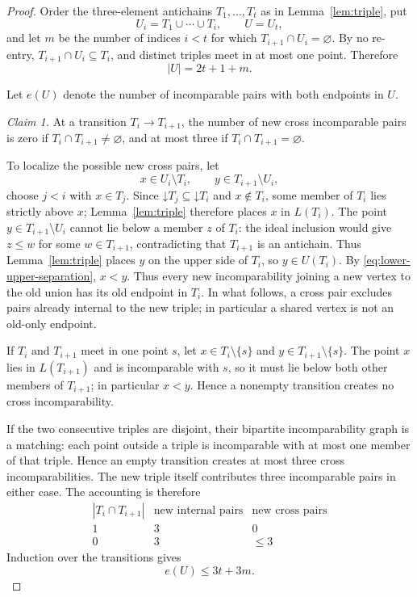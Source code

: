 \documentclass[11pt]{article}
\numberwithin{equation}{section}
\theoremstyle{definition}
\theoremstyle{remark}
\newcommand{\down}{\mathord{\downarrow}}
\begin{document}
\begin{proof}
Order the three-element antichains
$T_1,\ldots,T_t$ as in Lemma~\ref{lem:triple}, put
\[
        U_i=T_1\cup\cdots\cup T_i,\qquad U=U_t,
\]
and let $m$ be the number of indices $i<t$ for which
$T_{i+1}\cap U_i=\varnothing$.  By no re-entry,
$T_{i+1}\cap U_i\subseteq T_i$, and distinct triples meet in at most one
point.  Therefore
\begin{equation}\label{eq:triple-union-card}
|U|=2t+1+m.
\end{equation}

Let $e(U)$ denote the number of incomparable pairs with both endpoints in
$U$.

\emph{Claim 1.}  At a transition $T_i\to T_{i+1}$, the number of new cross
incomparable pairs is zero if $T_i\cap T_{i+1}\ne\varnothing$, and at most
three if $T_i\cap T_{i+1}=\varnothing$.

To localize the possible new cross pairs, let
\[
 x\in U_i\setminus T_i,\qquad
 y\in T_{i+1}\setminus U_i,
\]
choose $j<i$ with $x\in T_j$.  Since $\down T_j\subseteq\down T_i$
and $x\notin T_i$, some member of $T_i$ lies strictly above $x$;
Lemma~\ref{lem:triple} therefore places $x$ in $L(T_i)$.
The point $y\in T_{i+1}\setminus U_i$ cannot lie below a member
$z$ of $T_i$: the ideal inclusion would give $z\le w$ for some
$w\in T_{i+1}$, contradicting that $T_{i+1}$ is an antichain.
Thus Lemma~\ref{lem:triple} places $y$ on the upper side of $T_i$,
so $y\in U(T_i)$.  By \eqref{eq:lower-upper-separation}, $x<y$.
Thus every new incomparability joining a new vertex to the old union
has its old endpoint in $T_i$.  In what follows, a cross pair excludes
pairs already internal to the new triple; in particular a shared vertex
is not an old-only endpoint.

If $T_i$ and $T_{i+1}$ meet in one point $s$, let
$x\in T_i\setminus\{s\}$ and
$y\in T_{i+1}\setminus\{s\}$.  The point $x$ lies in $L(T_{i+1})$ and is
incomparable with $s$, so it must lie below both other members of
$T_{i+1}$; in particular $x<y$.  Hence a nonempty transition creates no
cross incomparability.

If the two consecutive triples are disjoint, their bipartite
incomparability graph is a matching: each point outside a triple is
incomparable with at most one member of that triple.  Hence an empty
transition creates at most three cross incomparabilities.  The new triple
itself contributes three incomparable pairs in either case.  The accounting
is therefore
\[
\begin{array}{c|c|c}
|T_i\cap T_{i+1}| & \text{new internal pairs} & \text{new cross pairs}\\
\hline
1 & 3 & 0\\
0 & 3 & \le3
\end{array}
\]
Induction over the transitions gives
\begin{equation}\label{eq:union-pair-bound}
e(U)\le3t+3m.
\end{equation}


\end{proof}
\end{document}
